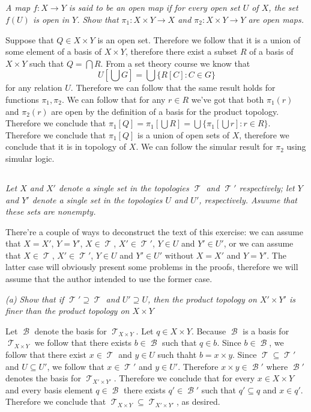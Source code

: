\documentclass[11pt,oneside,titlepage]{book}
\DeclareMathOperator \topol {\mathcal {T}}
\DeclareMathOperator \basis {\mathcal {B}}
\newcommand{\set}[1]{\{ #1 \}}
\begin{document}
\subsection{}

\textit{A map $f: X \to Y$ is said to be an open map if for every open set $U$ of $X$, the
  set $f(U)$ is open in $Y$. Show that $\pi_1: X \times Y \to X$ and
  $\pi_2 : X \times Y \to Y$ are open maps.}

Suppose that $Q \in X \times Y$ is an open set. Therefore we follow that it is a union of
some element of a basis of $X \times Y$, therefore there exist a subset $R$ of a basis of
$X \times Y$ such that $Q = \bigcap{R}$. From a set theory course we know that
$$U[\bigcup{G}] = \bigcup{\set{R[C]: C \in G}}$$
for any relation $U$. Therefore we can follow that the same result holds for functions
$\pi_1, \pi_2$. We can follow that for any $r \in R$ we've got that both $\pi_1(r)$ and
$\pi_2(r)$ are open by the definition of a basis for the product topology. Therefore we
conclude that $\pi_1[Q] = \pi_1[\bigcup{R}] = \bigcup{\set{\pi_1[\bigcup{r}]: r \in R}}$.
Therefore we conclude that $\pi_1[Q]$ is a union of open sets of $X$, therefore we conclude that
it is in topology of $X$. We can follow the simular result for $\pi_2$ using simular logic.

\subsection{}

\textit{Let $X$ and $X'$ denote a single set in the topologies $\topol$ and $\topol'$
  respectively; let $Y$ and $Y'$ denote a single set in the topologies $U$ and $U'$,
  respectively. Asuume that these sets are nonempty. }

There're a couple of ways to deconstruct the text of this exercise: 
we can assume that  $X = X'$,
$Y = Y'$, $X \in \topol$, $X' \in \topol'$, $Y \in U$ and $Y' \in U'$,
or we can assume that $X \in \topol$, $X' \in \topol'$, $Y \in U$ and $Y' \in U'$
without $X = X'$ and $Y = Y'$. The latter case will obviously present some problems
in the proofs, therefore we will assume that the author intended to use the former case.

\textit{(a) Show that if $\topol' \supseteq \topol$ and $U' \supseteq U$, then the product
  topology on $X' \times Y'$ is finer than the product topology on $X \times Y$}

Let $\basis$ denote the basis for $\topol_{X \times Y}$. Let $q \in X \times Y$.
Because $\basis$ is a basis for $\topol_{X \times Y}$ we follow that there exists
$b \in \basis$ such that $q \in b$. Since $b \in \basis$, we follow that there
exist $x \in \topol$ and $y \in U$ such thaht $b = x \times y$.
Since $\topol \subseteq \topol'$ and $U \subseteq U'$,
we follow that $x \in \topol'$ and $y \in U'$. Therefore $x \times y \in \basis'$
where $\basis'$ denotes the basis for $\topol_{X' \times Y'}$. Therefore we conclude that
for every $x \in X \times Y$ and every basis element $q \in \basis$ there exists
$q' \in \basis'$ such that $q' \subseteq q$ and $x \in q'$. Therefore we conclude that
$\topol_{X \times Y} \subseteq \topol_{X' \times Y'}$, as desired.
\end{document}

